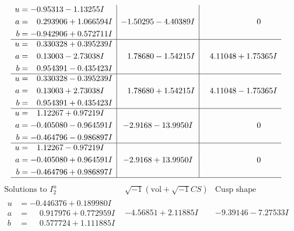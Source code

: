 \documentclass[1p]{elsarticle_modified}
\theoremstyle{definition}
\newcommand{\I}{\sqrt{-1}}
\begin{document}
$$\begin{array}{c|c|c}
\begin{aligned}
u &= -0.95313 - 1.13255 I \\
a &= \phantom{-}0.293906 + 1.066594 I \\
b &= -0.942906 + 0.572711 I\end{aligned}
 & -1.50295 - 4.40389 I & \phantom{-0.000000 } 0 \\ \hline\begin{aligned}
u &= \phantom{-}0.330328 + 0.395239 I \\
a &= \phantom{-}0.13003 - 2.73038 I \\
b &= \phantom{-}0.954391 - 0.435423 I\end{aligned}
 & \phantom{-}1.78680 - 1.54215 I & \phantom{-}4.11048 + 1.75365 I \\ \hline\begin{aligned}
u &= \phantom{-}0.330328 - 0.395239 I \\
a &= \phantom{-}0.13003 + 2.73038 I \\
b &= \phantom{-}0.954391 + 0.435423 I\end{aligned}
 & \phantom{-}1.78680 + 1.54215 I & \phantom{-}4.11048 - 1.75365 I \\ \hline\begin{aligned}
u &= \phantom{-}1.12267 + 0.97219 I \\
a &= -0.405080 - 0.964591 I \\
b &= -0.464796 - 0.986897 I\end{aligned}
 & -2.9168 - 13.9950 I & \phantom{-0.000000 } 0 \\ \hline\begin{aligned}
u &= \phantom{-}1.12267 - 0.97219 I \\
a &= -0.405080 + 0.964591 I \\
b &= -0.464796 + 0.986897 I\end{aligned}
 & -2.9168 + 13.9950 I & \phantom{-0.000000 } 0\\
 \hline 
 \end{array}$$\newpage$$\begin{array}{c|c|c}  
\text{Solutions to }I^u_{2}& \I (\text{vol} + \sqrt{-1}CS) & \text{Cusp shape}\\
 \hline 
\begin{aligned}
u &= -0.446376 + 0.189980 I \\
a &= \phantom{-}0.917976 + 0.772959 I \\
b &= \phantom{-}0.577724 + 1.111885 I\end{aligned}
 & -4.56851 + 2.11885 I & -9.39146 - 7.27533 I \\ \hline\begin{aligned}

\end{aligned}
\end{array}$$
\end{document}
